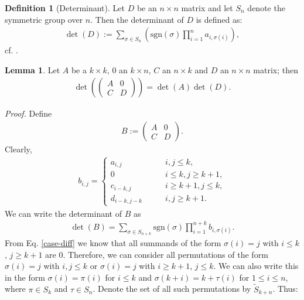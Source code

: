 \documentclass[12pt, a4paper]{article}
\numberwithin{equation}{section}
\theoremstyle{definition}
\theoremstyle{definition}
\newtheorem{defn}[thm]{Definition} %
\newtheorem{lemma}[thm]{Lemma} %
\begin{document}
	\begin{defn}[Determinant]
		Let $D$ be an $n\times n$ matrix and let $S_n$ denote the symmetric group over $n$. Then the determinant of $D$ is defined as:  
		\begin{align}
			\det(D) := \sum_{\sigma\in S_n} \left( \text{sgn}(\sigma) \prod_{i = 1}^{n}a_{i, \sigma(i)} \right),  
		\end{align}
		cf. \cite{leibniz-formula}. 
	\end{defn}

	\begin{lemma}
		Let $A$ be a $k\times k$, $0$ an $k\times n$, $C$ an $n\times k$ and $D$ an $n\times n$ matrix; then 
		\begin{align}
			\det\left( \begin{pmatrix}	A & 0 \\ C & D \end{pmatrix} \right) = \det(A)\det(D). 
		\end{align}
	\end{lemma}
	\noindent \textit{Proof.} Define 
	\begin{align}
		B := \begin{pmatrix} A & 0 \\ C & D
		\end{pmatrix}. 
	\end{align}
	Clearly, 
	\begin{align}\label{case-diff}
		b_{i,j} = 
		\begin{cases}
			a_{i, j} \qquad &i, j\leq k, \\
			0 		 \qquad &i\leq k, j \geq k+1, \\
			c_{i-k, j} \qquad &i\geq k+1, j \leq k, \\
			d_{i-k, j-k} \qquad &i, j\geq k+1. 
		\end{cases}
	\end{align}
	We can write the determinant of $B$ as 
	\begin{align}
		\det(B) = \sum_{\sigma\in S_{n+k}} \text{sgn}(\sigma)\prod_{i = 1}^{n+k}b_{i, \sigma(i)}. 
	\end{align}
	From Eq. \eqref{case-diff} we know that all summands of the form $\sigma(i) = j$ with $i\leq k$, $j\geq k+1$ are $0$. Therefore, we can consider all permutations of the form $\sigma(i) = j$ with $i, j \leq k$ or $\sigma(i) = j$ with $i\geq k+1$, $j\leq k$. We can also write this in the form $\sigma(i) = \pi(i)$ for $i\leq k$ and $\sigma(k + i) = k + \tau(i)$ for $1\leq i \leq n$, where $\pi\in S_k$ and $\tau\in S_n$. Denote the set of all such permutations by $\tilde{S}_{k+n}$.  Thus: 
\end{document}

